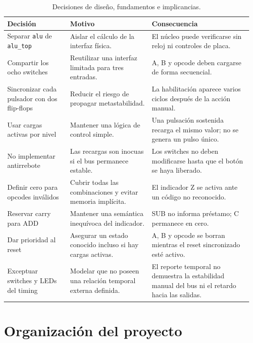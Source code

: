 \begin{table}[H]
	\centering
	\small
	\begin{tabularx}{\textwidth}{L{3.8cm}L{5.0cm}Y}
		\toprule
		\textbf{Decisión} & \textbf{Motivo} & \textbf{Consecuencia} \\
		\midrule
		Separar \texttt{alu} de \texttt{alu\_top} & Aislar el cálculo de la
		interfaz física. & El núcleo puede verificarse sin reloj ni
		controles de placa. \\
		Compartir los ocho switches & Reutilizar una interfaz limitada para
		tres entradas. & A, B y opcode deben cargarse de forma secuencial. \\
		Sincronizar cada pulsador con dos flip-flops & Reducir el riesgo de
		propagar metastabilidad. & La habilitación aparece varios ciclos
		después de la acción manual. \\
		Usar cargas activas por nivel & Mantener una lógica de control
		simple. & Una pulsación sostenida recarga el mismo valor; no se
		genera un pulso único. \\
		No implementar antirrebote & Las recargas son inocuas si el bus
		permanece estable. & Los switches no deben modificarse hasta que el
		botón se haya liberado. \\
		Definir cero para opcodes inválidos & Cubrir todas las
		combinaciones y evitar memoria implícita. & El indicador Z se
		activa ante un código no reconocido. \\
		Reservar carry para ADD & Mantener una semántica inequívoca del
		indicador. & SUB no informa préstamo; C permanece en cero. \\
		Dar prioridad al reset & Asegurar un estado conocido incluso si hay
		cargas activas. & A, B y opcode se borran mientras el reset
		sincronizado esté activo. \\
		Exceptuar switches y LEDs del timing & Modelar que no poseen una
		relación temporal externa definida. & El reporte temporal no
		demuestra la estabilidad manual del bus ni el retardo hacia las salidas. \\
		\bottomrule
	\end{tabularx}
	\caption{Decisiones de diseño, fundamentos e implicancias.}%
	\label{tab:decisiones}
\end{table}

\clearpage
\section{Organización del proyecto}

